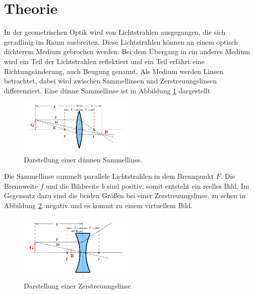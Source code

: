 \section{Theorie}
\label{sec:Theorie}
In der geometrischen Optik wird von Lichtstrahlen ausgegangen, die sich geradlinig im Raum ausbreiten.
Diese Lichtstrahlen können an einem optisch dichterem Medium gebrochen werden.
Bei dem Übergang in ein anderes Medium wird ein Teil der Lichtstrahlen reflektiert und ein Teil erfährt eine
Richtungsänderung, auch Beugung genannt.
Als Medium werden Linsen betrachtet, dabei wird zwischen Sammellinsen und Zerstreuungslinsen
differenziert.
Eine dünne Sammellinse ist in Abbildung \ref{fig:duenn} dargestellt
\begin{figure}
 \centering
 \includegraphics[width=0.5\textwidth]{duenn.png}
 \caption{Darstellung einer dünnen Sammellinse.\cite{sample}}
 \label{fig:duenn}
 \end{figure}
Die Sammellinse sammelt parallele Lichtstrahlen in dem Brennpunkt $F$. Die Brennweite $f$ und die Bildweite $b$
sind positiv, somit entsteht ein reelles Bild. Im Gegensatz dazu sind die beiden Größen bei einer Zerstreuungslinse,
zu sehen in Abbildung \ref{fig:streu}, negativ und es kommt zu einem virtuellem Bild.
\begin{figure}
 \centering
 \includegraphics[width=0.5\textwidth]{streu.png}
 \caption{Darstellung einer Zerstreuungslinse.\cite{sample}}
 \label{fig:streu}
 \end{figure}

